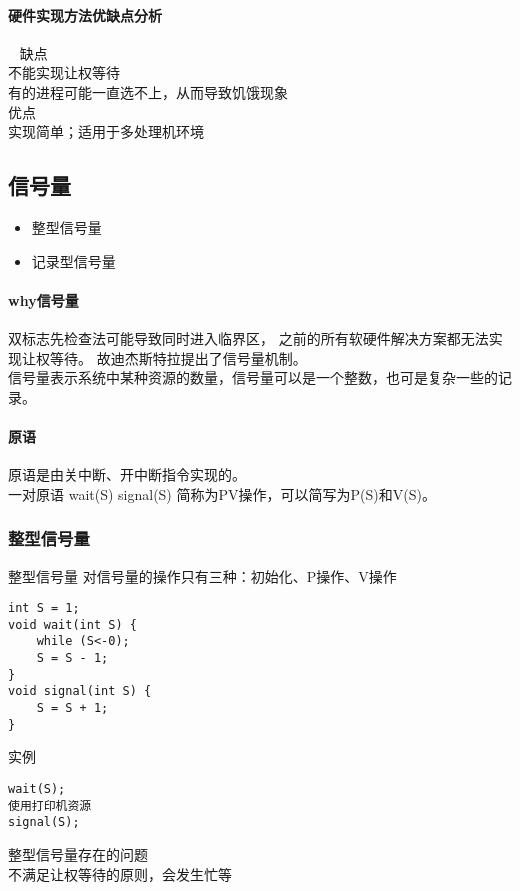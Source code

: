 \paragraph{硬件实现方法优缺点分析}~{}
\newline
缺点 \\
不能实现让权等待 \\
有的进程可能一直选不上，从而导致饥饿现象 \\
优点 \\
实现简单；适用于多处理机环境 \\

\subsection{信号量}
\begin{itemize}
	\item 整型信号量
	\item 记录型信号量
\end{itemize}

\paragraph{why信号量} 双标志先检查法可能导致同时进入临界区，
之前的所有软硬件解决方案都无法实现让权等待。
故迪杰斯特拉提出了信号量机制。 \\

信号量表示系统中某种资源的数量，信号量可以是一个整数，也可是复杂一些的记录。 \\

\paragraph{原语} 原语是由关中断、开中断指令实现的。 \\
一对原语
wait(S) signal(S)
简称为PV操作，可以简写为P(S)和V(S)。 \\

\subsubsection{整型信号量}
整型信号量
对信号量的操作只有三种：初始化、P操作、V操作

\begin{lstlisting}	
int S = 1;
void wait(int S) {
	while (S<-0);
	S = S - 1;
}
void signal(int S) {
	S = S + 1;
}	
\end{lstlisting}

实例
\begin{lstlisting}
wait(S);
使用打印机资源
signal(S);
\end{lstlisting}
整型信号量存在的问题 \\
不满足让权等待的原则，会发生忙等 \\

